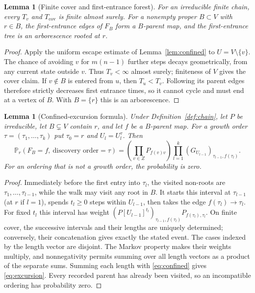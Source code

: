 \documentclass[11pt]{article}
\newtheorem{lemma}[definition]{Lemma}
\begin{document}
\begin{lemma}[Finite cover and first-entrance forest]
\label{lem:cover}
For an irreducible finite chain, every $T_v$ and
$T_{\mathrm{cov}}$ is finite almost surely. For a nonempty proper
$B\subset V$ with $r\in B$, the
first-entrance edges of $F_B$ form a $B$-parent map, and the
first-entrance tree is an arborescence rooted at $r$.
\end{lemma}
\begin{proof}
Apply the uniform escape estimate of
Lemma~\ref{lem:confined} to $U=V\setminus\{v\}$.
The chance of avoiding $v$ for $m(n-1)$ further steps decays
geometrically, from any current state outside $v$. Thus
$T_v<\infty$ almost surely; finiteness of $V$ gives the cover
claim. If $v\notin B$ is entered from $u$, then $T_u<T_v$.
Following its parent edges therefore strictly decreases first
entrance times, so it cannot cycle and must end at a vertex of
$B$. With $B=\{r\}$ this is an arborescence.
\end{proof}

\begin{lemma}[Confined-excursion formula]
\label{lem:excursion}
Under Definition~\ref{def:chain}, let $P$ be irreducible, let
$B\subsetneq V$ contain $r$, and let $f$ be a $B$-parent map.
For a growth order $\tau=(\tau_1,\ldots,\tau_k)$ put
$\tau_0=r$ and $U_l=U_l^\tau$. Then
\begin{equation}\label{eq:excursion}
\mathbb P_r(F_B=f,\ \text{discovery order}=\tau)
=\left(\prod_{v\in Z}P_{f(v)v}\right)
 \prod_{l=1}^{k}(G_{U_{l-1}})_{\tau_{l-1},f(\tau_l)}.
\end{equation}
For an ordering that is not a growth order, the probability is zero.
\end{lemma}
\begin{proof}
Immediately before the first entry into $\tau_l$, the visited
non-roots are $\tau_1,\ldots,\tau_{l-1}$, while the walk may
visit any root in $B$. It starts this interval at $\tau_{l-1}$
(at $r$ if $l=1$), spends $t_l\geq0$ steps within $U_{l-1}$,
then takes the edge $f(\tau_l)\to\tau_l$.
For fixed $t_l$ this interval has weight
$(P[U_{l-1}]^{t_l})_{\tau_{l-1},f(\tau_l)}
P_{f(\tau_l),\tau_l}$.
On finite cover, the successive intervals and their lengths are
uniquely determined; conversely, their concatenation gives exactly
the stated event. The cases indexed by the length vector are
disjoint. The Markov property makes their weights multiply, and
nonnegativity permits summing over all length vectors as a product
of the separate sums.
Summing each length with \eqref{eq:confined} gives
\eqref{eq:excursion}. Every recorded parent has already been
visited, so an incompatible ordering has probability zero.
\end{proof}
\end{document}
